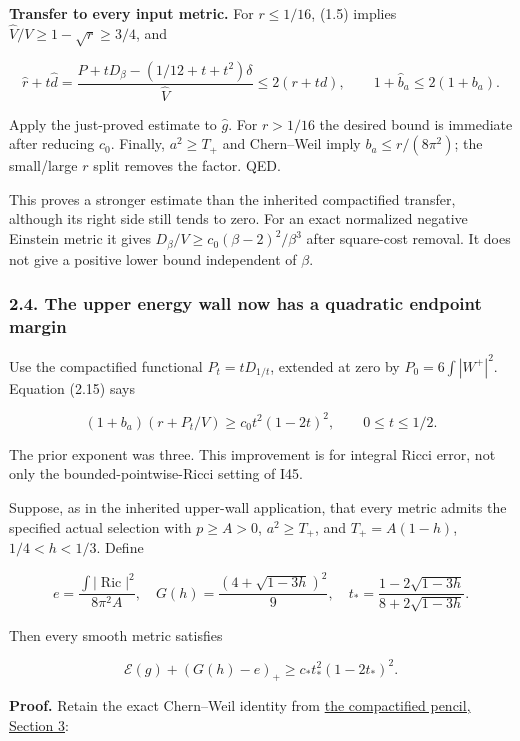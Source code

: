 \documentclass[
  10pt,
]{article}
\begin{document}
\textbf{Transfer to every input metric.} For \(r\le1/16\), (1.5) implies
\(\widehat V/V\ge1-\sqrt r\ge3/4\), and

\[
 \widehat r+t\widehat d
 =\frac{P+tD_\beta-(1/12+t+t^2)\delta}{\widehat V}
 \le2(r+td),\qquad
 1+\widehat b_a\le2(1+b_a).
\]

Apply the just-proved estimate to \(\widehat g\). For \(r>1/16\) the
desired bound is immediate after reducing \(c_0\). Finally,
\(a^2\ge T_+\) and Chern--Weil imply \(b_a\le r/(8\pi^2)\); the
small/large \(r\) split removes the factor. QED.

This proves a stronger estimate than the inherited compactified
transfer, although its right side still tends to zero. For an exact
normalized negative Einstein metric it gives
\(D_\beta/V\ge c_0(\beta-2)^2/\beta^3\) after square-cost removal. It
does not give a positive lower bound independent of \(\beta\).

\hypertarget{the-upper-energy-wall-now-has-a-quadratic-endpoint-margin}{%
\subsubsection{2.4. The upper energy wall now has a quadratic endpoint
margin}\label{the-upper-energy-wall-now-has-a-quadratic-endpoint-margin}}

Use the compactified functional \(P_t=tD_{1/t}\), extended at zero by
\(P_0=6\int|W^+|^2\). Equation (2.15) says

\[
 \boxed{(1+b_a)(r+P_t/V)\ge c_0t^2(1-2t)^2,
                    \qquad 0\le t\le1/2.}
 \tag{2.20}
\]

The prior exponent was three. This improvement is for integral Ricci
error, not only the bounded-pointwise-Ricci setting of I45.

Suppose, as in the inherited upper-wall application, that every metric
admits the specified actual selection with \(p\ge A>0\), \(a^2\ge T_+\),
and \(T_+=A(1-h)\), \(1/4<h<1/3\). Define

\[
 e=\frac{\int|\operatorname{Ric}|^2}{8\pi^2A},\quad
 G(h)=\frac{(4+\sqrt{1-3h})^2}{9},\quad
 t_* =\frac{1-2\sqrt{1-3h}}{8+2\sqrt{1-3h}}.
\]

Then every smooth metric satisfies

\[
 \boxed{\mathcal E(g)+(G(h)-e)_+
                    \ge c_* t_*^2(1-2t_*)^2.}
 \tag{2.21}
\]

\textbf{Proof.} Retain the exact Chern--Weil identity from
\href{../mathematics/current/line1_compactified_pencil.md}{the
compactified pencil, Section 3}:
\end{document}
